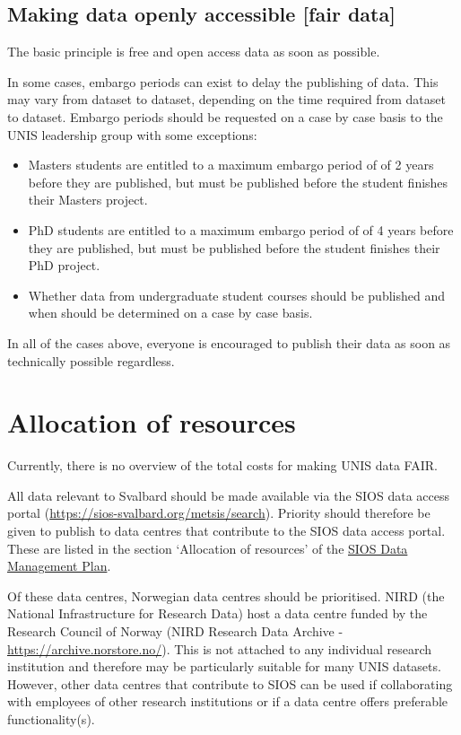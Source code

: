 \documentclass[a4paper,english, 11pt]{article}
\begin{document}
\subsection{Making data openly accessible [fair data]}
\label{ss:accessible}

The basic principle is free and open access data as soon as possible. 

In some cases, embargo periods can exist to delay the publishing of data. This may vary from dataset to dataset, depending on the time required from dataset to dataset. Embargo periods should be requested on a case by case basis to the UNIS leadership group with some exceptions:

 \begin{itemize}
 \item Masters students are entitled to a maximum embargo period of of 2 years before they are published, but must be published before the student finishes their Masters project. 
 \item PhD students are entitled to a maximum embargo period of of 4 years before they are published, but must be published before the student finishes their PhD project.
 \item Whether data from undergraduate student courses should be published and when should be determined on a case by case basis. 
 \end{itemize}

In all of the cases above, everyone is encouraged to publish their data as soon as technically possible regardless.

\section{Allocation of resources}
\label{s:resources}

Currently, there is no overview of the total costs for making UNIS data FAIR. 

All data relevant to Svalbard should be made available via the SIOS data access portal (\url{https://sios-svalbard.org/metsis/search}). Priority should therefore be given to publish to data centres that contribute to the SIOS data access portal. These are listed in the section `Allocation of resources' of the \href{https://sios-svalbard.org/sites/sios-svalbard.org/files/common/SIOS_Data_Management_Plan.pdf}{SIOS Data Management Plan}.

Of these data centres, Norwegian data centres should be prioritised. NIRD (the National Infrastructure for Research Data) host a data centre funded by the Research Council of Norway (NIRD Research Data Archive - \url{https://archive.norstore.no/}). This is not attached to any individual research institution and therefore may be particularly suitable for many UNIS datasets. However, other data centres that contribute to SIOS can be used if collaborating with employees of other research institutions or if a data centre offers preferable functionality(s).
\end{document}

